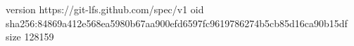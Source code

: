 version https://git-lfs.github.com/spec/v1
oid sha256:84869a412e568ea5980b67aa900efd6597fc9619786274b5cb85d16ca90b15df
size 128159
